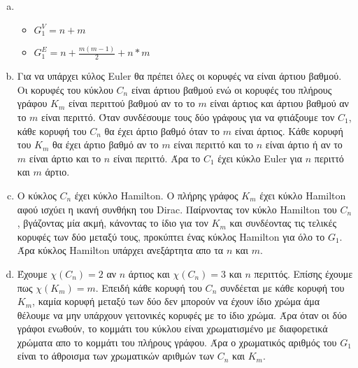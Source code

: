 \documentclass{assignment}
\begin{document}
\solution

\begin{enumerate}[(a)]
\item
\begin{itemize}[label={}]
  \item $\displaystyle G_1^V = n + m$ 
  \item $\displaystyle G_1^E = n + \frac{m(m-1)}{2} + n*m$
\end{itemize}

\item
Για να υπάρχει κύλος \textlatin{Euler} θα πρέπει όλες οι κορυφές να είναι άρτιου βαθμού. 
Οι κορυφές του κύκλου $C_n$ είναι άρτιου βαθμού ενώ οι κορυφές του πλήρους γράφου $K_m$ είναι περιττού 
βαθμού αν το το $m$ είναι άρτιος και άρτιου βαθμού αν το $m$ είναι περιττό. Όταν συνδέσουμε τους δύο γράφους
για να φτιάξουμε τον $C_1$, κάθε κορυφή του $C_n$ θα έχει άρτιο βαθμό όταν το $m$ είναι άρτιος.
Κάθε κορυφή του $K_m$ θα έχει άρτιο βαθμό αν το $m$ είναι περιττό και το $n$ είναι άρτιο ή αν το $m$ 
είναι άρτιο και το $n$ είναι περιττό. Άρα το $C_1$ έχει κύκλο \textlatin{Euler} για $n$ περιττό και $m$ άρτιο.

\item
Ο κύκλος $C_n$ έχει κύκλο \textlatin{Hamilton}. Ο πλήρης γράφος $K_m$ έχει κύκλο \textlatin{Hamilton} αφού 
ισχύει η ικανή συνθήκη του \textlatin{Dirac}. Παίρνοντας τον κύκλο \textlatin{Hamilton} του $C_n$, βγάζοντας
μία ακμή, κάνοντας το ίδιο για τον $K_m$ και συνδέοντας τις τελικές κορυφές των δύο μεταξύ τους, προκύπτει ένας
κύκλος \textlatin{Hamilton} για όλο το $G_1$. Άρα κύκλος \textlatin{Hamilton} υπάρχει ανεξάρτητα απο τα $n$ και $m$.

\item
Έχουμε $\chi(C_n) = 2$ αν $n$ άρτιος και $\chi(C_n) = 3$ και $n$ περιττός. Επίσης έχουμε πως $\chi(K_m) = m$. Επειδή
κάθε κορυφή του $C_n$ συνδέεται με κάθε κορυφή του $K_m$, καμία κορυφή μεταξύ των δύο δεν μπορούν να έχουν ίδιο χρώμα
άμα θέλουμε να μην υπάρχουν γειτονικές κορυφές με το ίδιο χρώμα. Άρα όταν οι δύο γράφοι ενωθούν, το κομμάτι του κύκλου 
είναι χρωματισμένο με διαφορετικά χρώματα απο το κομμάτι του πλήρους γράφου. Άρα ο χρωματικός αριθμός του $G_1$ είναι
το άθροισμα των χρωματικών αριθμών των $C_n$ και $K_m$.

\end{enumerate}

\end{document}
